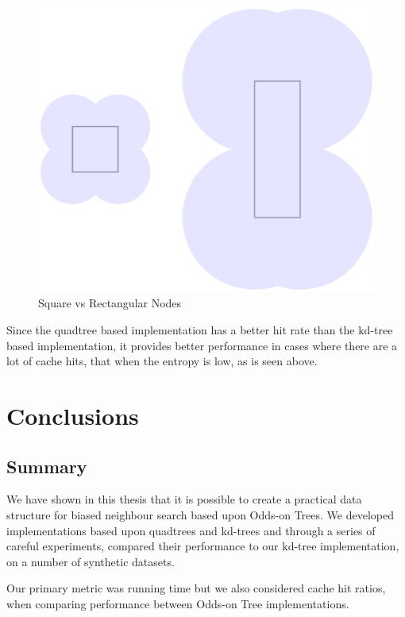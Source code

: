 \documentclass[mcs]{scsthesis}
\begin{document}
\begin{figure}
\begin{center}
\includegraphics[scale=0.5]{diagrams/node_coverage.eps}
\caption{Square vs Rectangular Nodes}
\label{fig:node_coverage}
\end{center}
\end{figure}

Since the quadtree based implementation has a better hit rate than the kd-tree
based implementation, it provides better performance in cases where there are
a lot of cache hits, that when the entropy is low, as is seen above.

\chapter{Conclusions}

\section{Summary}

We have shown in this thesis that it is possible to create a practical data
structure for biased neighbour search based upon Odds-on Trees. We developed
implementations based upon quadtrees and kd-trees and through a series of
careful experiments, compared their performance to our kd-tree implementation,
on a number of synthetic datasets.

Our primary metric was running time but we also considered cache hit ratios,
when comparing performance between Odds-on Tree implementations.
\end{document}
